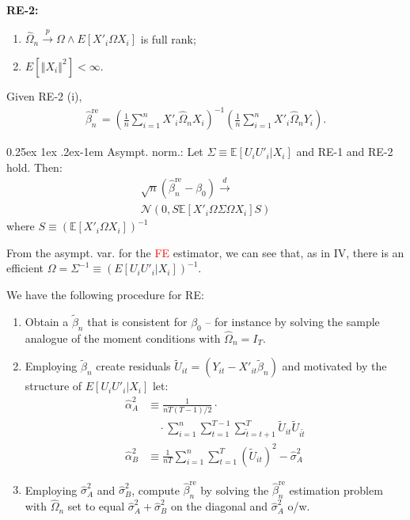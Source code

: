 \documentclass[9pt]{extarticle}
\makeatletter
\newcommand{\EE}{\mathbb{E}}
\renewcommand{\paragraph}{%
  \@startsection{paragraph}{4}%
  {\z@}{0.25ex \@plus 1ex \@minus .2ex}{-1em}%
  {\normalfont\normalsize\bfseries}%
}
\newcommand{\comments}[1]{\textcolor{red}{#1}}
\newcommand{\darrow}{\overset{d}{\rightarrow}}
\makeatother
\begin{document}
\begin{multicols*}{4}
\textbf{RE-2:}
\begin{enumerate}[label=(\roman*)]
    \item $\hat{\Omega}_{n}\overset{p}{\rightarrow}\Omega \land E\left[X'_{i}\Omega X_{i}\right]$ is full rank;
    \item $E\left[\left\Vert X_{i}\right\Vert ^{2}\right]<\infty$.
\end{enumerate}
Given RE-2 (i),
\begin{gather*}
    \hat{\beta}_{n}^\text{re} = ( \frac{1}{n} \sum_{i=1}^n X'_i \hat{\Omega}_n X_i )^{-1} (\frac{1}{n}\sum_{i=1}^n X'_i\hat{\Omega}_n Y_i).
\end{gather*}

\paragraph{Asympt. norm.:} Let $\Sigma\equiv \EE[U_{i}U'_{i}|X_{i}]$ and RE-1 and RE-2 hold. Then:
\begin{gather*}
    \sqrt{n}\left(\hat{\beta}_{n}^\text{re}-\beta_{0}\right) \darrow \\
    \mathcal{N}\left(0,S \EE\left[X'_{i}\Omega\Sigma\Omega X_{i}\right]S \right)
\end{gather*}
where $S \equiv \left(\EE\left[X'_{i}\Omega X_{i}\right]\right)^{-1}$

From the asympt. var. for the \comments{FE} estimator, we can see that, as in IV, there is an efficient $\Omega=\Sigma^{-1}\equiv\left(E\left[U_{i}U'_{i}|X_{i}\right]\right)^{-1}$.

We have the following procedure for RE:
\begin{enumerate}
    \item Obtain a $\tilde{\beta}_{n}$ that is consistent for $\beta_{0}$ -- for instance by solving the sample analogue of the moment conditions with $\hat{\Omega}_{n}=I_{T}$.
    \item Employing $\tilde{\beta}_{n}$ create residuals $\tilde{U}_{it}=\left(Y_{it}-X'_{it}\tilde{\beta}_{n}\right)$ and motivated by the structure of $E\left[U_{i}U'_{i}|X_{i}\right]$ let:
    \begin{align*}
        \hat{\alpha}_{A}^{2} &\equiv\frac{1}{nT\left(T-1\right)/2} \cdot \\ &\quad \cdot \sum_{i=1}^{n}\sum_{t=1}^{T-1}\sum_{\tilde{t}=t+1}^{T}\tilde{U}_{it}\tilde{U}_{i\tilde{t}} \\
        \hat{\alpha}_{B}^{2}&\equiv\frac{1}{nT}\sum_{i=1}^{n}\sum_{t=1}^{T}\left(\tilde{U}_{it}\right)^{2}-\hat{\sigma}_{A}^{2}
    \end{align*}
    \item Employing $\hat{\sigma}_{A}^{2}$ and $\hat{\sigma}_{B}^{2}$, compute $\hat{\beta}_{n}^\text{re}$ by solving the $\hat{\beta}_{n}^\text{re}$ estimation problem with $\hat{\Omega}_{n}$ set to equal $\hat{\sigma}_{A}^{2} + \hat{\sigma}_{B}^{2}$ on the diagonal and $\hat{\sigma}_{A}^{2}$ o/w.
\end{enumerate}



\end{multicols*}
\end{document}

